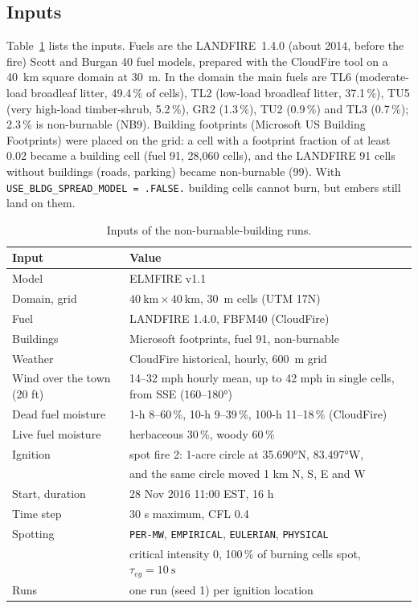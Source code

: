 \subsection{Inputs}
Table~\ref{tab:inputs} lists the inputs. Fuels are the LANDFIRE~1.4.0 (about 2014, before the fire)
Scott and Burgan 40 fuel models, prepared with the CloudFire tool on a \SI{40}{\kilo\metre} square domain
at \SI{30}{\metre}. In the domain the main fuels are TL6 (moderate-load broadleaf litter, 49.4\,\% of
cells), TL2 (low-load broadleaf litter, 37.1\,\%), TU5 (very high-load timber-shrub, 5.2\,\%),
GR2 (1.3\,\%), TU2 (0.9\,\%) and TL3 (0.7\,\%); 2.3\,\% is non-burnable (NB9). Building footprints
(Microsoft US Building Footprints) were placed on the grid: a cell with a footprint fraction of at least
0.02 became a building cell (fuel 91, 28{,}060 cells), and the LANDFIRE 91 cells without buildings
(roads, parking) became non-burnable (99). With \texttt{USE\_BLDG\_SPREAD\_MODEL = .FALSE.} building
cells cannot burn, but embers still land on them.

\begin{table}[htbp]
  \centering
  \caption{Inputs of the non-burnable-building runs.}
  \label{tab:inputs}
  \small
  \begin{tabular}{@{}lp{}@{}}
    \toprule
    Input & Value \\
    \midrule
    Model & ELMFIRE v1.1 \\
    Domain, grid & $\SI{40}{\kilo\metre}\times\SI{40}{\kilo\metre}$, \SI{30}{\metre} cells (UTM 17N) \\
    Fuel & LANDFIRE 1.4.0, FBFM40 (CloudFire) \\
    Buildings & Microsoft footprints, fuel 91, non-burnable \\
    Weather & CloudFire historical, hourly, \SI{600}{\metre} grid \\
    Wind over the town (20 ft) & 14--32 mph hourly mean, up to 42 mph in single cells, from SSE (160--180\si{\degree}) \\
    Dead fuel moisture & 1-h 8--60\,\%, 10-h 9--39\,\%, 100-h 11--18\,\% (CloudFire) \\
    Live fuel moisture & herbaceous 30\,\%, woody 60\,\% \\
    Ignition & spot fire 2: 1-acre circle at \ang{35.690}N, \ang{83.497}W, \\
             & and the same circle moved 1 km N, S, E and W \\
    Start, duration & 28 Nov 2016 11:00 EST, 16 h \\
    Time step & 30 s maximum, CFL 0.4 \\
    Spotting & \texttt{PER-MW}, \texttt{EMPIRICAL}, \texttt{EULERIAN}, \texttt{PHYSICAL} \\
             & critical intensity 0, 100\,\% of burning cells spot, $\tau_{eg}=\SI{10}{\second}$ \\
    Runs & one run (seed 1) per ignition location \\
    \bottomrule
  \end{tabular}
\end{table}

